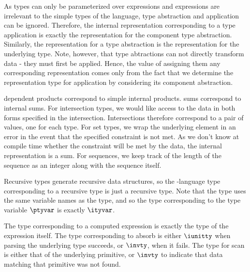 As types can only be parameterized over expressions and expressions
are irrelevant to the simple types of the \implang{} language, type
abstraction and application can be ignored. Therefore, the internal
representation corresponding to a type application is exactly the
representation for the component type abstraction.  Similarly, the
representation for a type abstraction is the representation for the
underlying type. Note, however, that type abtractions can not directly
transform data - they must first be applied. Hence, the value of
assigning them any corresponding representation comes only from the
fact that we determine the representation type for application by
considering its component abstraction.

\ddc{} dependent products correspond to simple internal products.  \ddc{}
sums correspond to internal sums.
For intersection types, we would like access to the data in both forms
specified in the intersection.  Intersections therefore correspond to
a pair of values, one for each type. For set types, we wrap the
underlying element in an error in the event that the specified
constraint is not met. As we don't know at compile time whether the
constraint will be met by the data, the internal representation is a
sum. For sequences, we keep track of the length of the sequence as an
integer along with the sequence itself.

Recursive types generate recursive data structures, so the
\implang{}-language type corresponding to a recursive \ddc{} type is
just a recursive \implang{} type. Note that the \implang{} type uses the same
variable names as the \ddc{} type, and so the type corresponding to
the type variable $\ptyvar$ is exactly $\ityvar$.

The type corresponding to a computed expression is exactly the type of
the expression itself.  The type corresponding to absorb is either
$\iunitty$ when parsing the underlying type succeeds, or $\invty$,
when it fails. The type for scan is either that of the underlying
primitive, or $\invty$ to indicate that data matching that primitive
was not found.


